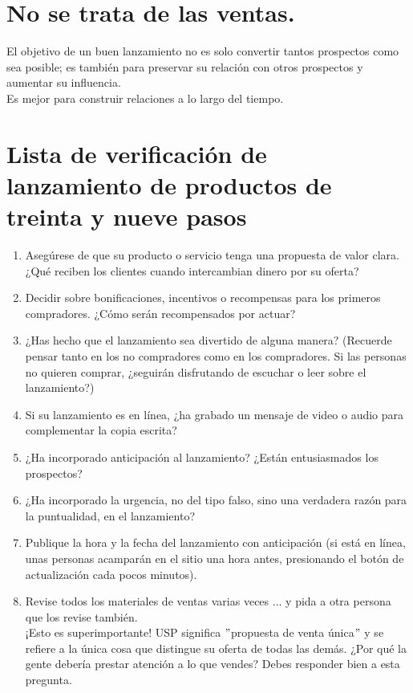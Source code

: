 \documentclass[10pt]{book}
\begin{document}
	\section{No se trata de las ventas.}
	El objetivo de un buen lanzamiento no es solo convertir tantos prospectos como sea posible; es también para preservar su relación con otros prospectos y aumentar su influencia.\\
	Es mejor para construir relaciones a lo largo del tiempo.

	\section{Lista de verificación de lanzamiento de productos de treinta y nueve pasos}	

	\begin{enumerate}[\bfseries 1.]
		\item Asegúrese de que su producto o servicio tenga una propuesta de valor clara.  ¿Qué reciben los clientes cuando intercambian dinero por su oferta?
		\item Decidir sobre bonificaciones, incentivos o recompensas para los primeros compradores. ¿Cómo serán recompensados por actuar?
		\item ¿Has hecho que el lanzamiento sea divertido de alguna manera? (Recuerde pensar tanto en los no compradores como en los compradores. Si las personas no quieren comprar, ¿seguirán disfrutando de escuchar o leer sobre el lanzamiento?)
		\item Si su lanzamiento es en línea, ¿ha grabado un mensaje de video o audio para complementar la copia escrita?
		\item ¿Ha incorporado anticipación al lanzamiento? ¿Están entusiasmados los prospectos?
		\item ¿Ha incorporado la urgencia, no del tipo falso, sino una verdadera razón para la puntualidad, en el lanzamiento?
		\item Publique la hora y la fecha del lanzamiento con anticipación (si está en línea, unas personas acamparán en el sitio una hora antes, presionando el botón de actualización cada pocos minutos).
		\item Revise todos los materiales de ventas varias veces ... y pida a otra persona que los revise también.\\
		¡Esto es superimportante! USP significa $"$propuesta de venta única$"$ y se refiere a la única cosa que distingue su oferta de todas las demás. ¿Por qué la gente debería prestar atención a lo que vendes? Debes responder bien a esta pregunta.

\end{enumerate}
\end{document}
